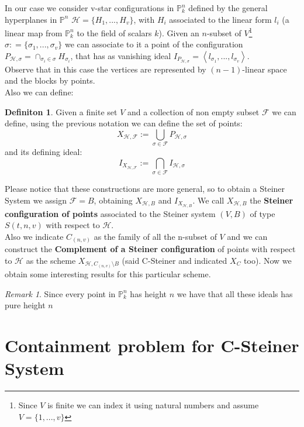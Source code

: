 \documentclass[a4wide]{book}
\theoremstyle{plain}
\theoremstyle{remark}
\newtheorem{rem}{Remark}
\theoremstyle{definition}
\newtheorem{deff}[teo]{Definiton}
\newcommand{\PP}{\mathbb{P}}
\newcommand{\HH}{\mathcal{H}}
\begin{document}
In our case we consider v-star configurations in $ \PP_k^n $ defined by the general hyperplanes in $ \PP^n $ $ \HH  = \{ H_1 , ... , H_v\}$, with $ H_i $ associated to the linear form $ l_i $ (a linear map from $ \PP_k^n $ to the field of scalars $ k $). Given an $ n $-subset of $ V $\footnote{Since $ V $ is finite we can index it using natural numbers and assume $ V = \{ 1 , ... , v\} $} $ \sigma : = \{ \sigma_1 , ... , \sigma_v\}$ we can associate to it a point of the configuration $ P_{\HH, \sigma }= \cap_{\sigma_i \in \sigma} H_{\sigma_i}$, that has as vanishing ideal $ I_{P_{\HH, \sigma}} = \left< l_{\sigma_1} , ... , l_{\sigma_v} \right\rangle $.\\
 Observe that in this case the vertices are represented by $( n-1 )$-linear space and the blocks by points.\\
 Also we can define:
 \begin{deff}\label{def:gensys}
 Given a finite set $ V $ and a collection of non empty subset $ \mathcal{F} $ we can define, using the previous notation we can define the set of points:
 \begin{equation}\label{eq:X}
 X_{\HH , \mathcal{F}}:= \bigcup_{\sigma \in \mathcal{F} } P_{\HH, \sigma }
 \end{equation}
 and its defining ideal:
 \begin{equation}\label{eq:I}
 I_{X_{\HH , \mathcal{F}}}:= \bigcap_{\sigma \in \mathcal{F} } I_{\HH, \sigma }
 \end{equation}
 \end{deff}
 Please notice that these constructions are more general, so to obtain a Steiner System we assign $ \mathcal{F}=B $, obtaining $ X_{\HH , B} $ and $  I_{X_{\HH , B}} $. 
 We call  $ X_{\HH , B} $ the \textbf{Steiner configuration of points} associated to the Steiner system $ (V , B) $ of type $ S(t , n,v) $ with respect to $ \HH $. \\
 Also we indicate $ C_{(n,v)} $ as the family of all the n-subset of $ V $ and we can construct the \textbf{Complement of a Steiner configuration} of points with respect to $ \HH $ as the scheme $ X_{\HH , C_{(n,v)} \setminus B} $ (said C-Steiner and indicated $ X_C $ too).
Now we obtain some interesting results for this particular scheme. 
\begin{rem}
Since every point in $ \PP_k^n $ has height $ n $ we have that all these ideals has pure height $ n $
\end{rem}
 
 \section{Containment problem for C-Steiner System}
 
\end{document}
